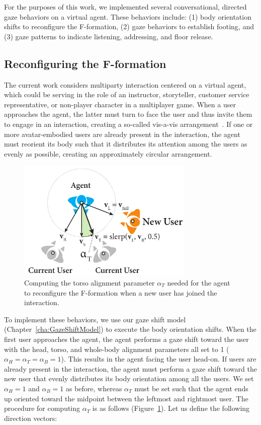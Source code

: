 For the purposes of this work, we implemented several conversational, directed gaze behaviors on a virtual agent. These behaviors include: (1) body orientation shifts to reconfigure the F-formation, (2) gaze behaviors to establish footing, and (3) gaze patterns to indicate listening, addressing, and floor release.

\subsection{Reconfiguring the F-formation}

The current work considers multiparty interaction centered on a virtual agent, which could be serving in the role of an instructor, storyteller, customer service representative, or non-player character in a multiplayer game. When a user approaches the agent, the latter must turn to face the user and thus invite them to engage in an interaction, creating a so-called vis-a-vis arrangement~\cite{kendon1990conducting}. If one or more avatar-embodied users are already present in the interaction, the agent must reorient its body such that it distributes its attention among the users as evenly as possible, creating an approximately circular arrangement.

\begin{figure}
\centering
\includegraphics[width=0.75\textwidth]{conversationalrolegaze/Figures/FTorsoAlign.pdf}
\caption{Computing the torso alignment parameter $\alpha_T$ needed for the agent to reconfigure the F-formation when a new user has joined the interaction.}
\label{fig:FTorsoAlign}
\end{figure}

To implement these behaviors, we use our gaze shift model (Chapter~\ref{cha:GazeShiftModel}) to execute the body orientation shifts. When the first user approaches the agent, the agent performs a gaze shift toward the user with the head, torso, and whole-body alignment parameters all set to 1 ($\alpha_H = \alpha_T = \alpha_B = 1$). This results in the agent facing the user head-on. If users are already present in the interaction, the agent must perform a gaze shift toward the new user that evenly distributes its body orientation among all the users. We set $\alpha_H = 1$ and $\alpha_B = 1$ as before, whereas $\alpha_T$ must be set such that the agent ends up oriented toward the midpoint between the leftmost and rightmost user. The procedure for computing $\alpha_T$ is as follows (Figure~\ref{fig:FTorsoAlign}). Let us define the following direction vectors:

